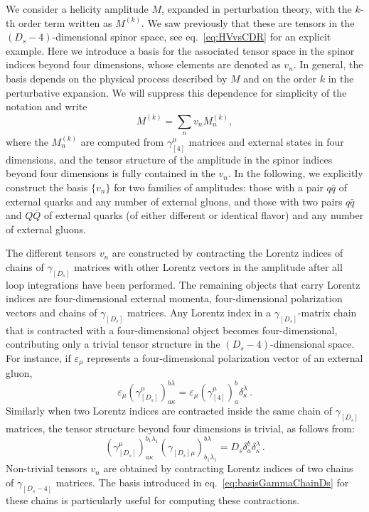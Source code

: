We consider a helicity amplitude $M$, expanded in 
perturbation theory, with the $k$-th order term written as
$M^{(k)}$.
We saw previously that these are tensors in the
$(D_s-4)$-dimensional spinor space, see
eq.~\eqref{eq:HVvsCDR} for an explicit example.
Here we introduce a basis for the associated tensor space in the
spinor indices beyond four dimensions, whose elements are 
denoted as $v_n$. In general,
the basis depends on the physical process described 
by $M$ and on the order $k$ in the perturbative
expansion. We will suppress this dependence for simplicity of 
the notation and write
\begin{equation}
  M^{(k)}= \sum_n  v_n M^{(k)}_n,
\label{eq:tensorDecomposition}
\end{equation}
where the $M^{(k)}_n$ are computed from
$\gamma_{[4]}^{\mu}$ matrices and external states in four dimensions, and the tensor structure
of the amplitude in the spinor indices beyond four dimensions is
fully contained in the $v_n$.
In the following, we explicitly construct the basis $\{v_n\}$
for two families of amplitudes: those with a pair $q\bar q$ of
external
quarks and any number of external gluons, and
those with two pairs $q\bar q$ and $Q\bar Q$
of external quarks (of either different or identical
flavor) and any number of external gluons.

The different tensors $v_n$ are constructed by contracting the
Lorentz indices of chains of $\gamma_{[D_s]}$ matrices with
other Lorentz vectors in the amplitude after all loop
integrations have been performed. The remaining objects that
carry Lorentz indices are four-dimensional external momenta,
four-dimensional polarization vectors and chains of $\gamma_{[D_s]}$
matrices. Any Lorentz index in a $\gamma_{[D_s]}$-matrix 
chain that is contracted with a four-dimensional object becomes
four-dimensional, contributing only a trivial tensor structure 
in the $(D_s-4)$-dimensional space. For instance, if $\varepsilon_\mu$ represents a
four-dimensional polarization vector of an external gluon,
\begin{equation}
	\label{eq:trivialTens1}
	\varepsilon_\mu
	\left(
	\gamma_{[D_s]}^\mu
	\right)_{a\kappa}^{b\lambda}
	=\varepsilon_\mu\left(\gamma_{[4]}^\mu
	\right)_{a}^{b}\delta_{\kappa}^{\lambda}\,.
\end{equation}
Similarly when two Lorentz indices are contracted inside the 
same chain of $\gamma_{[D_s]}$ matrices, the tensor structure
beyond four dimensions is trivial, as follows from:
\begin{equation}
	\label{eq:trivialTens2}
	\left(\gamma_{[D_s]}^\mu\right)_{a \kappa}^{b_1 \lambda_1}
        \left(\gamma_{[D_s]\mu}^{\phantom{\mu}}\right)_{b_1 \lambda_1}^{b \lambda}
	=D_s\delta_{a}^{b}\delta_{\kappa}^{\lambda}\,.
\end{equation}
Non-trivial tensors $v_n$ are obtained by contracting
Lorentz indices of two chains of $\gamma_{[D_s-4]}$ matrices.
The basis introduced in eq.~\eqref{eq:basisGammaChainDs} 
for these chains is particularly useful for
computing these contractions.

